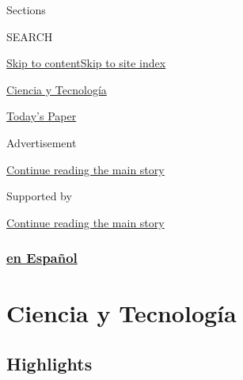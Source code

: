 Sections

SEARCH

\protect\hyperlink{site-content}{Skip to
content}\protect\hyperlink{site-index}{Skip to site index}

\href{https://www.nytimes3xbfgragh.onion/es/section/ciencia-y-tecnologia}{Ciencia
y Tecnología}

\href{https://myaccount.nytimes3xbfgragh.onion/auth/login?response_type=cookie\&client_id=vi}{}

\href{https://www.nytimes3xbfgragh.onion/section/todayspaper}{Today's
Paper}

Advertisement

\protect\hyperlink{after-top}{Continue reading the main story}

Supported by

\protect\hyperlink{after-sponsor}{Continue reading the main story}

\hypertarget{en-espauxf1ol}{%
\subsubsection{\texorpdfstring{\href{/es/}{en
Español}}{en Español}}\label{en-espauxf1ol}}

\hypertarget{ciencia-y-tecnologuxeda}{%
\section{Ciencia y Tecnología}\label{ciencia-y-tecnologuxeda}}

\hypertarget{highlights}{%
\subsection{Highlights}\label{highlights}}

